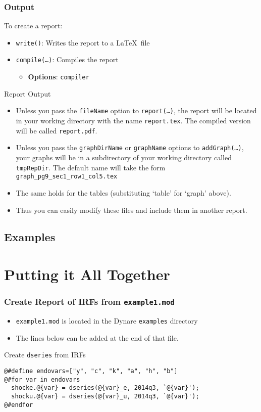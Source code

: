 \documentclass[10pt]{beamer}
\newcommand{\myitem}{\item[$\bullet$]}
\begin{document}
\begin{frame}
  \frametitle{Output}
  To create a report:
  \begin{itemize}
  \myitem \texttt{write()}: Writes the report to a \LaTeX\ file
  \myitem \texttt{compile(\ldots)}: Compiles the report
    \begin{itemize}
    \myitem \textbf{Options}: \texttt{compiler}
    \end{itemize}
  \end{itemize}
  Report Output
  \begin{itemize}
  \myitem Unless you pass the \texttt{fileName} option to \texttt{report(\ldots)}, the report will be located in your working directory with the name \texttt{report.tex}. The compiled version will be called \texttt{report.pdf}.
  \myitem Unless you pass the \texttt{graphDirName} or \texttt{graphName} options to \texttt{addGraph(\ldots)}, your graphs will be in a subdirectory of your working directory called \texttt{tmpRepDir}. The default name will take the form \texttt{graph\_pg9\_sec1\_row1\_col5.tex}
  \myitem The same holds for the tables (substituting `table' for `graph' above).
  \myitem Thus you can easily modify these files and include them in another report.
  \end{itemize}
\end{frame}


\subsection{Examples}

\section{Putting it All Together}
\begin{frame}[fragile=singleslide]
  \frametitle{Create Report of IRFs from \texttt{example1.mod}}
  \begin{itemize}
  \myitem \texttt{example1.mod} is located in the Dynare \texttt{examples} directory
  \myitem The lines below can be added at the end of that file.
  \end{itemize}
  \begin{block}{Create \texttt{dseries} from IRFs}
\begin{verbatim}
@#define endovars=["y", "c", "k", "a", "h", "b"]
@#for var in endovars
  shocke.@{var} = dseries(@{var}_e, 2014q3, `@{var}');
  shocku.@{var} = dseries(@{var}_u, 2014q3, `@{var}');
@#endfor
\end{verbatim}
  \end{block}
\end{frame}
\end{document}
